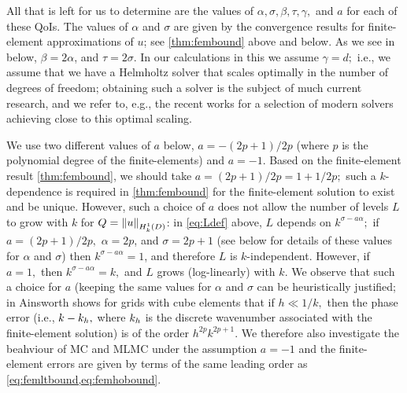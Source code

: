     All that is left for us to determine are the values of $\alpha, \sigma, \beta, \tau, \gamma,$ and $a$ for each of these QoIs. The values of $\alpha$ and $\sigma$ are given by the convergence results for finite-element approximations of $u$; see \cref{thm:fembound} above and  below. As we see in  below, $\beta = 2\alpha$, and $\tau = 2\sigma$. In our calculations in this  we assume $\gamma = d;$ i.e., we assume that we have a Helmholtz solver that scales optimally in the number of degrees of freedom; obtaining such a solver is the subject of much current research, and we refer to, e.g., the recent works \cite{GrSpVa:17,ZeScHeDe:19,TaZeHeDe:19} for a selection of modern solvers achieving close to this optimal scaling.

We use two different values of $a$ below, $a=-(2p+1)/2p$ (where $p$ is the polynomial degree of the finite-elements) and $a=-1$. Based on the finite-element result \cref{thm:fembound}, we should take $a=(2p+1)/2p = 1 + 1/2p;$ such a $k$-dependence is required in \cref{thm:fembound} for the finite-element solution to exist and be unique. However, such a choice of $a$ does not allow the number of levels $L$ to grow with $k$ for $Q = \NHokD{u}$: in \cref{eq:Ldef} above, $L$ depends on $k^{\sigma-a\alpha};$ if $a=(2p+1)/2p,$ $\alpha = 2p$, and $\sigma = 2p+1$ (see below for details of these values for $\alpha$ and $\sigma$) then $k^{\sigma-a\alpha} = 1$, and therefore $L$ is $k$-independent. However, if $a = 1,$ then $k^{\sigma-a\alpha} = k,$ and $L$ grows (log-linearly) with $k$. We observe that such a choice for $a$ (keeping the same values for $\alpha$ and $\sigma$ can be heuristically justified; in \cite[Theorem 3.2]{Ai:04} Ainsworth shows for grids with cube elements that if $h \ll 1/k,$ then the phase error (i.e., $k-k_{h},$ where $k_{h}$ is the discrete wavenumber associated with the finite-element solution) is of the order $h^{2p}k^{2p+1}$. We therefore also investigate the beahviour of MC and MLMC under the assumption $a=-1$ and the finite-element errors are given by terms of the same leading order as \cref{eq:femltbound,eq:femhobound}.

